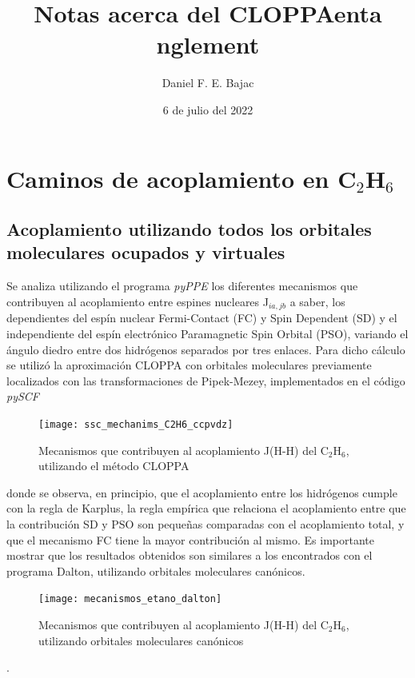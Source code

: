 \documentclass[
	12pt, %
]{fphw}
\title{Notas acerca del CLOPPAenta nglement} %
\author{Daniel F. E. Bajac} %
\date{6 de julio del 2022} %
\institute{Universidad Nacional del Nordeste \\ Departamento de Física} %
\begin{document}
\maketitle %


\section*{Caminos de acoplamiento en C$_2$H$_6$}

\subsection*{Acoplamiento utilizando todos los orbitales moleculares ocupados y virtuales}
Se analiza utilizando el programa \textit{pyPPE} los diferentes mecanismos que contribuyen al acoplamiento entre espines
nucleares J$_{ia,jb}$  a saber, los dependientes del espín nuclear Fermi-Contact (FC) y Spin Dependent (SD) y el 
independiente del espín electrónico Paramagnetic Spin Orbital (PSO), variando el ángulo diedro entre dos hidrógenos 
separados por tres enlaces. Para dicho cálculo se utilizó la aproximación CLOPPA  \cite{Cloppa} 
con orbitales moleculares previamente 
 localizados con las transformaciones de Pipek-Mezey, implementados en el código \textit{pySCF} 

\begin{figure}[h]
	\centering
	\texttt{[image: ssc\_mechanims\_C2H6\_ccpvdz]}	
	\caption{Mecanismos que contribuyen al acoplamiento J(H-H) del C$_2$H$_6$, utilizando el método CLOPPA}
	
\end{figure}

donde se observa, en principio, que el acoplamiento entre los hidrógenos cumple con la regla de Karplus, 
la regla empírica que relaciona el acoplamiento entre 
que la contribución SD y PSO son pequeñas comparadas con el acoplamiento total, 
y que el mecanismo FC tiene la mayor contribución al mismo. Es importante mostrar que los resultados obtenidos son similares a los
encontrados con el programa Dalton, utilizando orbitales moleculares canónicos.

\begin{figure}[h]
	\centering
	\texttt{[image: mecanismos\_etano\_dalton]}	
	\caption{Mecanismos que contribuyen al acoplamiento J(H-H) del C$_2$H$_6$, utilizando orbitales moleculares canónicos}
\end{figure}. 
\end{document}
